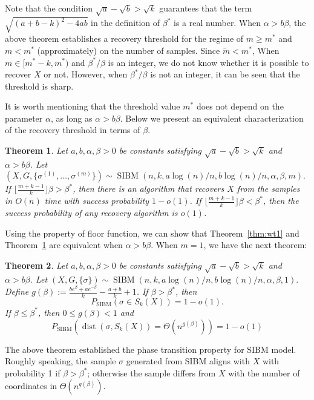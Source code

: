 \documentclass[conference]{IEEEtran}
\newtheorem{theorem}{Theorem}%
\DeclareMathOperator{\SIBM}{SIBM}
\DeclareMathOperator{\dist}{dist}
\begin{document}
	Note that the condition $\sqrt{a}-\sqrt{b} > \sqrt{k}$ guarantees that the term $\sqrt{(a+b-k)^2-4ab}$ in the definition of $\beta^\ast$ is a real number.
	When $\alpha > b \beta$,
	the above theorem establishes a recovery threshold
	for the regime of $m \geq m^\ast$ and $m < m^\ast$ (approximately) on the number of samples. Since $\tilde{m} < m^*$,
	When $m \in [m^* - k, m^\ast)$ and $\beta^\ast/\beta$ is an integer, we do not know whether it is possible to recover $X$ or not.
	However, when $\beta^\ast/\beta$ is not an integer, it can be seen that the threshold is sharp.
	
	It is worth mentioning that the threshold value $m^\ast$ does not depend on the parameter $\alpha$, as long as $\alpha>b\beta$.
	Below we present an equivalent characterization of the recovery threshold in terms of $\beta$.
	\begin{theorem} \label{thm:wt2}
		Let $a,b,\alpha,\beta> 0$ be constants satisfying $\sqrt{a}-\sqrt{b} > \sqrt{k}$ and $\alpha>b\beta$. 
		Let 
		$
		(X,G,\{\sigma^{(1)},\dots,\sigma^{(m)}\}) \sim \SIBM(n, k, a\log(n)/n, b\log(n)/n,\alpha,\beta,m).
		$
		If $\lfloor \frac{m+k-1}{k} \rfloor \beta>\beta^\ast$,
		then there is an algorithm that recovers $X$ from the samples in $O(n)$ time with success probability $1-o(1)$.
		If $\lfloor \frac{m+k-1}{k} \rfloor \beta <\beta^\ast$, then the success probability of any recovery algorithm is $o(1)$. 
	\end{theorem}
	Using the property of floor function, we can show that Theorem~\ref{thm:wt1} and Theorem~\ref{thm:wt2} are equivalent when $\alpha > b \beta$.
	When $m=1$, we have the next theorem:
	
	\begin{theorem}  \label{thm:wt3}
		Let $a,b,\alpha,\beta> 0$ be constants satisfying $\sqrt{a}-\sqrt{b} > \sqrt{k}$ and $\alpha>b\beta$.
		Let 
		$
		(X,G,\{\sigma\}) \sim \SIBM(n,k, a\log(n)/n, b\log(n)/n,\alpha,\beta,1).
		$
		Define $g(\beta)  := \frac{b e^{\beta}+a e^{-\beta}}{k}-\frac{a+b}{k}+1$.
		If $\beta>\beta^\ast$, then
		$$
		P_{\SIBM}(\sigma \in S_k(X)) = 1-o(1).
		$$
		If $\beta\le \beta^\ast$, then $0\leq g(\beta) < 1$ and
		$$
		P_{\SIBM}(\dist(\sigma, S_k(X))= \Theta(n^{g(\beta)})) = 1-o(1)
		$$
	\end{theorem}
	
	The above theorem established the phase transition property for SIBM model.
	Roughly speaking, the sample $\sigma$ generated from SIBM aligns with $X$ with probability 1 if $\beta > \beta^*$;
	otherwise the sample differs from $X$ with the number of coordinates in $\Theta(n^{g(\beta)})$.
\end{document}
